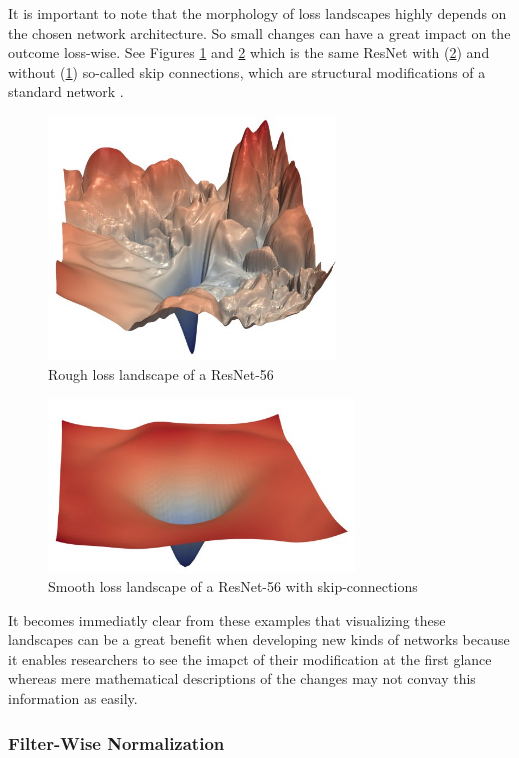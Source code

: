 \documentclass{acmsiggraph}               %
\begin{document}
It is important to note that the morphology of loss landscapes highly depends on the chosen network architecture. So small changes can have a great impact on the outcome loss-wise. See Figures \ref{fig:rough_loss} and \ref{fig:smooth_loss} which is the same ResNet with (\ref{fig:smooth_loss}) and without (\ref{fig:rough_loss}) so-called skip connections, which are structural modifications of a standard network \cite{He2015}.

\begin{figure}
\centering
\includegraphics[width=3in]{rough_loss}
\caption{Rough loss landscape of a ResNet-56 \protect\cite{Li2017}}
\label{fig:rough_loss}
\end{figure}

\begin{figure}
  \centering
  \includegraphics[width=3.2in]{smooth_loss}
  \caption{Smooth loss landscape of a ResNet-56 with skip-connections \protect\cite{Li2017,He2015}}
  \label{fig:smooth_loss}
\end{figure}

It becomes immediatly clear from these examples that visualizing these landscapes can be a great benefit when developing new kinds of networks because it enables researchers to see the imapct of their modification at the first glance whereas mere mathematical descriptions of the changes may not convay this information as easily.

\subsubsection{Filter-Wise Normalization}
\end{document}
